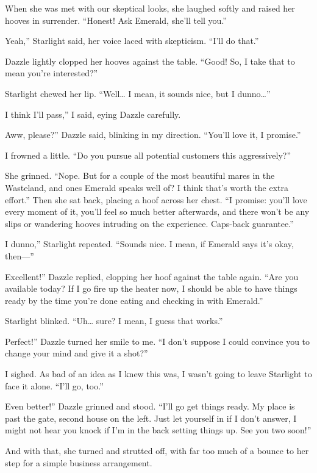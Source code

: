 When she was met with our skeptical looks, she laughed softly and raised her hooves in surrender. “Honest! Ask Emerald, she’ll tell you.”

\leavevmode{}Yeah,” Starlight said, her voice laced with skepticism. “I’ll do that.”

Dazzle lightly clopped her hooves against the table. “Good! So, I take that to mean you’re interested?”

Starlight chewed her lip. “Well… I mean, it sounds nice, but I dunno…”

\leavevmode{}I think I’ll pass,” I said, eying Dazzle carefully.

\leavevmode{}Aww, please?” Dazzle said, blinking in my direction. “You’ll love it, I promise.”

I frowned a little. “Do you pursue all potential customers this aggressively?”

She grinned. “Nope. But for a couple of the most beautiful mares in the Wasteland, and ones Emerald speaks well of? I think that’s worth the extra effort.” Then she sat back, placing a hoof across her chest. “I promise: you’ll love every moment of it, you’ll feel so much better afterwards, and there won’t be any slips or wandering hooves intruding on the experience. Caps-back guarantee.”

\leavevmode{}I dunno,” Starlight repeated. “Sounds nice. I mean, if Emerald says it’s okay, then—”

\leavevmode{}Excellent!” Dazzle replied, clopping her hoof against the table again. “Are you available today? If I go fire up the heater now, I should be able to have things ready by the time you’re done eating and checking in with Emerald.”

Starlight blinked. “Uh… sure? I mean, I guess that works.”

\leavevmode{}Perfect!” Dazzle turned her smile to me. “I don’t suppose I could convince you to change your mind and give it a shot?”

I sighed. As bad of an idea as I knew this was, I wasn’t going to leave Starlight to face it alone. “I’ll go, too.”

\leavevmode{}Even better!” Dazzle grinned and stood. “I’ll go get things ready. My place is past the gate, second house on the left. Just let yourself in if I don’t answer, I might not hear you knock if I’m in the back setting things up. See you two soon!”

And with that, she turned and strutted off, with far too much of a bounce to her step for a simple business arrangement.

